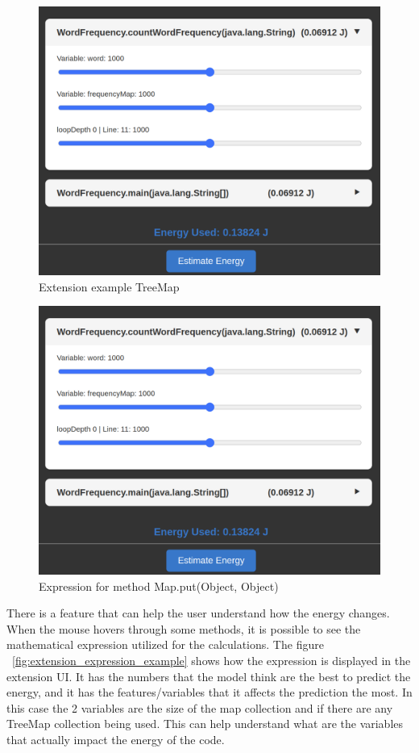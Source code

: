 \begin{figure}[htbp]
  \centering
  \includegraphics[width = .8 \textwidth]{figures/extension_example2.png}
  \caption{Extension example TreeMap}
  \label{fig:extension_example2}
\end{figure}



\begin{figure}[htbp]
  \centering
  \includegraphics[width = .8 \textwidth]{figures/extension_example2.png}
  \caption{Expression for method Map.put(Object, Object)}
  \label{fig:extension_example2}
\end{figure}

There is a feature that can help the user understand how the energy changes. When the mouse hovers through some methods, it is possible to see the mathematical expression utilized for the calculations. The figure ~\ref{fig:extension_expression_example} shows how the expression is displayed in the extension UI. It has the numbers that the model think are the best to predict the energy, and it has the features/variables that it affects the prediction the most. In this case the 2 variables are the size of the map collection and if there are any TreeMap collection being used. This can help understand what are the variables that actually impact the energy of the code. 
